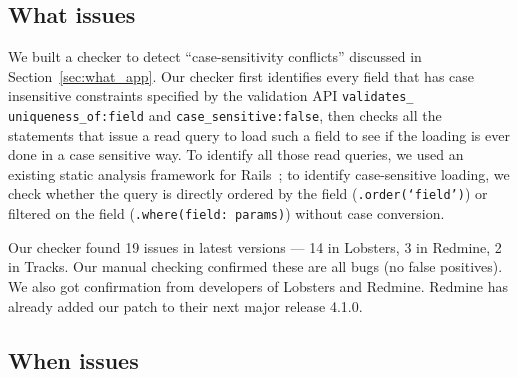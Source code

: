 \subsection{What issues}
We built a checker to detect ``case-sensitivity conflicts'' discussed
in Section~\ref{sec:what_app}. Our checker first identifies every field that has case insensitive constraints specified by the validation API {\tt validates\_ uniqueness\_of:field} and {\tt case\_sensitive:false}, then checks all the statements that issue a read query to load such a field to see if the loading is ever done in a case sensitive way. To identify all those read queries, we
used an existing static analysis framework for Rails~\cite{yang:fse18:powerstation}; to identify case-sensitive loading, we check whether the query is directly ordered by the field 
({\tt .order(`field')}) or filtered on the field ({\tt .where(field: params)}) 
without case conversion. 

Our checker found 19 issues in latest versions --- 14 in Lobsters, 3 in Redmine, 2 in Tracks. Our manual checking confirmed these are all bugs (no false positives). We also got confirmation
from developers of Lobsters and Redmine. Redmine has already added our patch to their next major release 4.1.0. 


\subsection{When issues}

